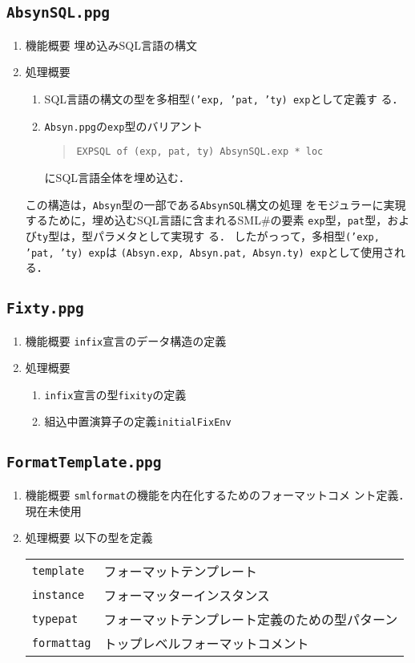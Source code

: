 \documentclass{jbook}
\newcommand{\smlsharp}{SML\#}
\newcommand{\code}[1]{\mbox{\large\tt #1}}
\newenvironment{program}{\begin{quote}\begin{tt}}%
                        {\end{tt}\end{quote}}
\begin{document}
\subsection{\code{AbsynSQL.ppg}}
\label{sec:AbsynSQL}
\begin{enumerate}
\item 機能概要 埋め込みSQL言語の構文
\item 処理概要 
\begin{enumerate}
\item SQL言語の構文の型を多相型\code{('exp, 'pat, 'ty) exp}として定義す
る．
\item \code{Absyn.ppg}の\code{exp}型のバリアント
\begin{program}
\code{EXPSQL of (exp, pat, ty) AbsynSQL.exp * loc}
\end{program}
にSQL言語全体を埋め込む．
\end{enumerate}
	この構造は，\code{Absyn}型の一部である\code{AbsynSQL}構文の処理
をモジュラーに実現するために，埋め込むSQL言語に含まれる\smlsharp{}の要素
\code{exp}型，\code{pat}型，および\code{ty}型は，型パラメタとして実現す
る．
	したがっって，多相型\code{('exp, 'pat, 'ty) exp}は
\code{(Absyn.exp, Absyn.pat, Absyn.ty) exp}として使用される．
\end{enumerate}

\subsection{\code{Fixty.ppg}}
\begin{enumerate}
\item 機能概要 \code{infix}宣言のデータ構造の定義
\item 処理概要 
\begin{enumerate}
\item \code{infix}宣言の型\code{fixity}の定義
\item 組込中置演算子の定義\code{initialFixEnv}
\end{enumerate}
\end{enumerate}

\subsection{\code{FormatTemplate.ppg}}
\begin{enumerate}
\item 機能概要 \code{smlformat}の機能を内在化するためのフォーマットコメ
ント定義．
	現在未使用
\item 処理概要 
以下の型を定義

\begin{tabular}{ll}
\code{template} & フォーマットテンプレート\\
\code{instance} & フォーマッターインスタンス\\
\code{typepat} & フォーマットテンプレート定義のための型パターン\\
\code{formattag} & トップレベルフォーマットコメント
\end{tabular}
\end{enumerate}
\end{document}
